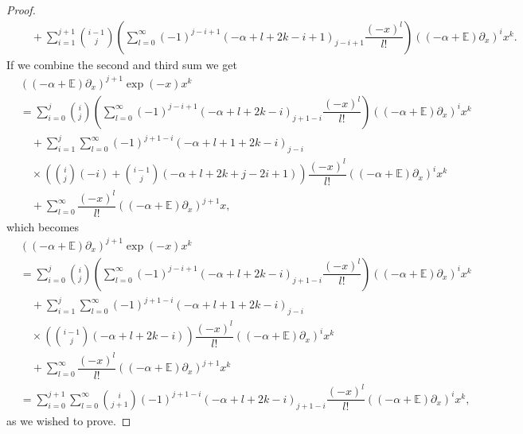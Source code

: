 \documentclass{amsart}
\numberwithin{theorem}{section}
\theoremstyle{definition}
\theoremstyle{remark}
\def\E{\mathds{E} }
\newcommand{\pt}[1]{\partial_{#1}}
\newcommand{\ds}[1]{\mathds{#1}}
\begin{document}
\begin{proof}
\begin{align*}
&\quad + \sum_{i=1}^{j+1}\binom{i-1}{j}\left(\sum_{l=0}^\infty(-1)^{j-i+1}(-\alpha+l+2k-i+1)_{j-i+1}\dfrac{(-x)^{l}}{l!}\right)((-\alpha+\E)\pt x)^{i}x^k.
\end{align*}
If we combine the second and third sum we get
\begin{align*}
&((-\alpha+\ds E)\pt x)^{j+1} \exp(-x)x^k\\
& = \sum_{i=0}^j\binom{i}{j}\left(\sum_{l=0}^\infty(-1)^{j-i+1}(-\alpha+l+2k-i)_{j+1-i}\dfrac{(-x)^{l}}{l!}\right)((-\alpha+\E)\pt x)^ix^k\\
&\quad + \sum_{i=1}^j\sum_{l=0}^\infty(-1)^{j+1-i}(-\alpha+l+1+2k-i)_{j-i}\\
&\quad \times\left(\binom{i}{j}(-i)+\binom{i-1}{j}(-\alpha+l+2k+j-2i+1)\right)\dfrac{(-x)^{l}}{l!}((-\alpha+\E)\pt x)^ix^k\\
&\quad +\sum_{l=0}^\infty \dfrac{(-x)^l}{l!}\left((-\alpha+\E)\pt x\right)^{j+1}x,
\end{align*}
which becomes
\begin{align*}
&((-\alpha+\ds E)\pt x)^{j+1} \exp(-x)x^k\\
& = \sum_{i=0}^j\binom{i}{j}\left(\sum_{l=0}^\infty(-1)^{j-i+1}(-\alpha+l+2k-i)_{j+1-i}\dfrac{(-x)^{l}}{l!}\right)((-\alpha+\E)\pt x)^ix^k\\
&\quad + \sum_{i=1}^j\sum_{l=0}^\infty(-1)^{j+1-i}(-\alpha+l+1+2k-i)_{j-i}\\
&\quad \times\left(\binom{i-1}{j}(-\alpha+l+2k-i)\right)\dfrac{(-x)^{l}}{l!}((-\alpha+\E)\pt x)^ix^k\\
&\quad +\sum_{l=0}^\infty \dfrac{(-x)^l}{l!}\left((-\alpha+\E)\pt x\right)^{j+1}x^k\\
& = \sum_{i=0}^{j+1}\sum_{l=0}^\infty\binom{i}{j+1}(-1)^{j+1-i}(-\alpha+l+2k-i)_{j+1-i}\dfrac{(-x)^l}{l!}((-\alpha+\E)\pt x)^ix^k,
\end{align*}
as we wished to prove.
\end{proof}
\end{document}
